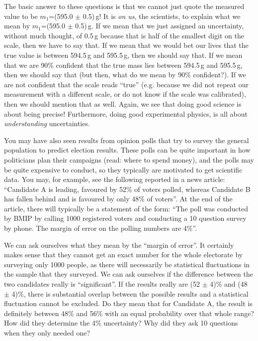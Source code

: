 The basic answer to these questions is that we cannot just quote the measured value to be $m_1$=(595.0 $\pm$ 0.5)\,g! It is \textit{on us}, the scientists, to explain what we mean by $m_1$=(595.0 $\pm$ 0.5)\,g. If we mean that we just assigned an uncertainty, without much thought, of 0.5\,g because that is half of the smallest digit on the scale, then we have to say that. If we mean that we would bet our lives that the true value is between 594.5\,g and 595.5\,g, then we should say that. If we mean that we are 90\% confident that the true mass lies between 594.5\,g and 595.5\,g, then we should say that (but then, what do we mean by 90\% confident?). If we are not confident that the scale reads ``true'' (e.g. because we did not repeat our measurement with a different scale, or do not know if the scale was calibrated), then we should mention that as well. Again, we see that doing good science is about being precise! Furthermore, doing good experimental physics, is all about \textit{understanding} uncertainties.

You may have also seen results from opinion polls that try to survey the general population to predict election results. These polls can be quite important in how politicians plan their campaigns (read: where to spend money), and the polls may be quite expensive to conduct, so they typically are motivated to get scientific data. You may, for example, see the following reported in a news article: ``Candidate A is leading, favoured by 52\% of voters polled, whereas Candidate B has fallen behind and is favoured by only 48\% of voters''. At the end of the article, there will typically be a statement of the form: ``The poll was conducted by BMIP by calling 1000 registered voters and conducting a 10 question survey by phone. The margin of error on the polling numbers are 4\%''.

We can ask ourselves what they mean by the ``margin of error''. It certainly makes sense that they cannot get an exact number for the whole electorate by surveying only 1000 people, as there will necessarily be statistical fluctuations in the sample that they surveyed. We can ask ourselves if the difference between the two candidates really is ``significant''. If the results really are (52 $\pm$ 4)\% and (48 $\pm$ 4)\%, there is substantial overlap between the possible results and a statistical fluctuation cannot be excluded. Do they mean that for Candidate A, the result is definitely between 48\% and 56\% with an equal probability over that whole range? How did they determine the 4\% uncertainty? Why did they ask 10 questions when they only needed one?


